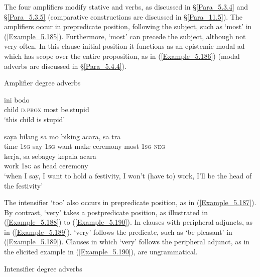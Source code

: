 The four amplifiers modify  stative and  verbs, as discussed in §\ref{Para_5.3.4} and §\ref{Para_5.3.5} (comparative constructions are discussed in §\ref{Para_11.5}). The amplifiers occur in prepredicate position, following the subject, such as  ‘most’ in (\ref{Example_5.185}). Furthermore,  ‘most’ can precede the subject, although not very often. In this clause-initial position it functions as an epistemic modal ad which has scope over the entire proposition, as in (\ref{Example_5.186}) (modal adverbs are discussed in §\ref{Para_5.4.4}).


\begin{styleExampleTitle}
Amplifier degree adverbs
\end{styleExampleTitle}

\ea
\label{Example_5.185}
 {ini} {} {bodo}\\ %
 child  \textsc{d.prox}  most  be.stupid\\
\glt 
‘this child is  stupid’ \textstyleExampleSource{[081011-005-Cv.0035]}
\z

\ea
\label{Example_5.186}
 {{saya}} {bilang} {{sa}} {{mo}} {biking} {acara,} {} {sa} {tra}\\ %
 {time}  {\textsc{1sg}}  say  {\textsc{1sg}}  {want}  make  ceremony  most  \textsc{1sg}  \textsc{neg}\\
\gll kerja,  {sa}  {sebagey}  {kepala}  {acara}\\
 work  {\textsc{1sg}}  {as}  {head}  {ceremony}\\
\glt 
‘when I say, I want to hold a festivity,  I won’t (have to) work, I’ll be the head of the festivity’ \textstyleExampleSource{[080919-004-NP.0068]}
\z


The intensifier  ‘too’ also occurs in prepredicate position, as in (\ref{Example_5.187}). By contrast,  ‘very’ takes a postpredicate position, as illustrated in (\ref{Example_5.188}) to (\ref{Example_5.190}). In clauses with peripheral adjuncts, as in (\ref{Example_5.189}),  ‘very’ follows the predicate, such as  ‘be pleasant’ in (\ref{Example_5.189}). Clauses in which  ‘very’ follows the peripheral adjunct, as in the elicited example in (\ref{Example_5.190}), are ungrammatical.


\begin{styleExampleTitle}
Intensifier degree adverbs
\end{styleExampleTitle}

